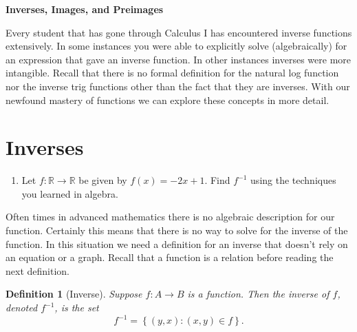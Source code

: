 \documentclass[12 pt]{article}
\newcommand{\R}{\mathbb{R}}
\newcommand{\set}[1]{\left\{#1\right\}}
\theoremstyle{definition}
\theoremstyle{plain}
\theoremstyle{mytheorem}
\theoremstyle{myexample}
\theoremstyle{mydefinition}
\newtheorem*{definition*}{Definition}
\begin{document}
\begin{center}
\textbf{Inverses, Images, and Preimages}
\end{center}

Every student that has gone through Calculus I has encountered inverse functions extensively.  In some instances you were able to explicitly solve (algebraically) for an expression that gave an inverse function.  In other instances inverses were more intangible.  Recall that there is no formal definition for the natural log function nor the inverse trig functions other than the fact that they are inverses.  With our newfound mastery of functions we can explore these concepts in more detail.

\begin{center}
\end{center}

\section{Inverses}

\begin{enumerate}
\item Let $f:\R \to \R$ be given by $f(x) = -2x+1$.  Find $f^{-1}$ using the techniques you learned in algebra.

\vspace{2in}
\end{enumerate}

Often times in advanced mathematics there is no algebraic description for our function.  Certainly this means that there is no way to solve for the inverse of the function.  In this situation we need a definition for an inverse that doesn't rely on an equation or a graph.  Recall that a function is a relation before reading the next definition.

\begin{definition*}[Inverse]  Suppose $f: A \to B$ is a function.  Then the \textit{inverse} of $f$, denoted $f^{-1}$, is the set
\[f^{-1} = \set{(y,x):(x,y)\in f}.\]
\end{definition*}
\end{document}
